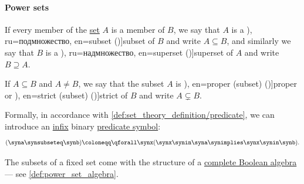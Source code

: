 \paragraph{Power sets}

\begin{definition}\label{def:subset}
  If every member of the \hyperref[def:set]{set} \( A \) is a member of \( B \), we say that \( A \) is a \term[bg=подмножество (\cite[144]{Тагамлицки1978ИнтегралноСмятане}), ru=подмножество, en=subset (\cite[def. 2.1.3]{Rosen2019DiscreteMathematics})]{subset} of \( B \) and write \( A \subseteq B \), and similarly we say that \( B \) is a \term[bg=подмножество (\cite[144]{Тагамлицки1978ИнтегралноСмятане}), ru=надмножество, en=superset (\cite[def. 2.1.3]{Rosen2019DiscreteMathematics})]{superset} of \( A \) and write \( B \supseteq A \).

  If \( A \subseteq B \) and \( A \neq B \), we say that the subset \( A \) is \term[ru=собственное (подмножество) (\cite[34]{БелоусовТкачёв2004ДискретнаяМатематика}), en=proper (subset) (\cite[126]{Rosen2019DiscreteMathematics})]{proper} or \term[ru=строгое (подмножество) (\cite[34]{БелоусовТкачёв2004ДискретнаяМатематика}), en=strict (subset) (\cite[403]{Müller2022HandbookOfDynamicsAndProbability})]{strict} of \( B \) and write \( A \subsetneq B \).

  Formally, in accordance with \cref{def:set_theory_definition/predicate}, we can introduce an \hyperref[def:fol_signature/notation]{infix} binary \hyperref[def:fol_signature/predicate]{predicate symbol}:
  \begin{equation*}
    (\syna \synsubseteq \synb) \coloneqq \qforall \synx (\synx \synin \syna \synimplies \synx \synin \synb).
  \end{equation*}
\end{definition}
\begin{comments}
  \item The subsets of a fixed set come with the structure of a \hyperref[def:boolean_algebra/complete]{complete Boolean algebra} --- see \cref{def:power_set_algebra}.
\end{comments}

